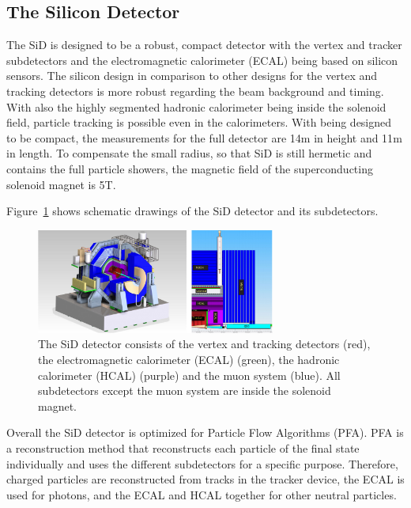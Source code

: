 \subsection{The Silicon Detector}
The SiD is designed to be a robust, compact detector with the vertex and tracker subdetectors and the electromagnetic calorimeter (ECAL) being based on silicon sensors.
The silicon design in comparison to other designs for the vertex and tracking detectors is more robust regarding the beam background and timing.
With also the highly segmented hadronic calorimeter being inside the solenoid field, particle tracking is possible even in the calorimeters.
With being designed to be compact, the measurements for the full detector are \unit{14}{m} in height and \unit{11}{m} in length.
To compensate the small radius, so that SiD is still hermetic and contains the full particle showers, the magnetic field of the superconducting solenoid magnet is \unit{5}{T}.

Figure~\ref{fig:SiD} shows schematic drawings of the SiD detector and its subdetectors.

\begin{figure}
\centering
\includegraphics[width=0.7\textwidth]{Figures/SiD.png}
\caption[Schematic drawing of the SiD detector]{The SiD detector consists of the vertex and tracking detectors (red), the electromagnetic calorimeter (ECAL) (green), the hadronic calorimeter (HCAL) (purple) and the muon system (blue). All subdetectors except the muon system are inside the solenoid magnet.\cite[p. 31]{TDR1}}
\label{fig:SiD}
\end{figure}

Overall the SiD detector is optimized for Particle Flow Algorithms (PFA).
PFA is a reconstruction method that reconstructs each particle of the final state individually and uses the different subdetectors for a specific purpose.
Therefore, charged particles are reconstructed from tracks in the tracker device, the ECAL is used for photons, and the ECAL and HCAL together for other neutral particles. 

